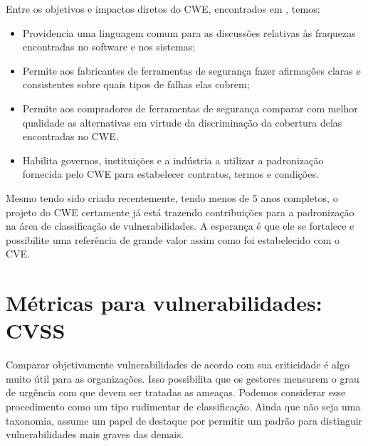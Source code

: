 			Entre os objetivos e impactos diretos do CWE, encontrados em \cite{CWE2009}, temos:
			\begin{itemize}
				\item{Providencia uma linguagem comum para as discussões relativas às fraquezas
					encontradas no software e nos sistemas;}
				\item{Permite aos fabricantes de ferramentas de segurança fazer afirmações
					claras e consistentes sobre quais tipos de falhas elas cobrem;}
				\item{Permite aos compradores de ferramentas de segurança comparar
					com melhor qualidade as alternativas em virtude da discriminação
					da cobertura delas encontradas no CWE.}
				\item{Habilita governos, instituições e a indústria a utilizar a padronização
					fornecida pelo CWE para estabelecer contratos, termos e condições.}
			\end{itemize}

			
			Mesmo tendo sido criado recentemente, tendo menos de 5 anos completos, o projeto do 
			CWE certamente já está trazendo	contribuições para a padronização na área de 
			classificação de vulnerabilidades.
			A esperança é que ele se fortalece e possibilite uma referência de grande valor
			assim como foi estabelecido com o CVE.


	\section{Métricas para vulnerabilidades: CVSS}
		Comparar objetivamente vulnerabilidades de acordo com sua criticidade é
		algo muito útil para as organizações.
		Isso possibilita que os gestores mensurem o grau de urgência com que devem
		ser tratadas as ameaças. Podemos considerar esse procedimento
		como um tipo rudimentar de classificação. Ainda que não seja uma taxonomia,
		assume um papel de destaque por permitir um padrão para distinguir
		vulnerabilidades mais graves das demais.

